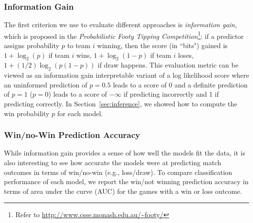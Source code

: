 \subsubsection{Information Gain}
\label{sec:informationGain}

The first criterion we use to evaluate different approaches is
\emph{information gain}, which is proposed in the \emph{Probabilistic Footy
Tipping Competition}\footnote{Refer to
\url{http://www.csse.monash.edu.au/~footy/}}: if a predictor assigns
probability $p$ to team $i$ winning, then the score (in ``bits")
gained is $1+\log_2(p)$ if team $i$ wins, $1+\log_2(1-p)$ if team $i$ loses, $1+(1/2)\log_2(p(1-p))$ if draw happens.
This evaluation metric can be viewed as an information gain
interpretable variant of a log likelihood score where an uninformed
prediction of $p=0.5$ leads to a score of 0 and a definite prediction
of $p=1$ ($p=0$) leads to a score of $-\infty$ if predicting
incorrectly and 1 if predicting correctly.
In Section~\ref{sec:inference}, we showed how to compute the win
probability $p$ for each model.

\subsubsection{Win/no-Win Prediction Accuracy}
\label{sec:WLPredictionAccuracy}

While information gain provides a sense of how well the models fit the
data, it is also interesting to see how accurate the models were at
predicting match outcomes in terms of win/no-win (e.g., loss/draw).  To compare
classification performance of each model, we report the
win/not winning prediction accuracy in terms of area under the curve (AUC) for the
games with a win or loss outcome.



